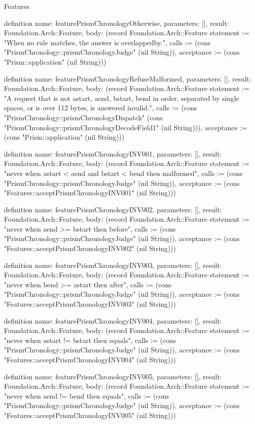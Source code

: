 \begin{lexlean}{Features}
\begin{semanticmodule}
definition{
  name: featurePrismChronologyOtherwise,
  parameters: [],
  result: Foundation.Arch::Feature,
  body: (record Foundation.Arch::Feature {statement := "When no rule matches, the answer is overlappedby.", calls := (cons "PrismChronology::prismChronologyJudge" (nil String)), acceptance := (cons "Prism::application" (nil String))})
}

definition{
  name: featurePrismChronologyRefuseMalformed,
  parameters: [],
  result: Foundation.Arch::Feature,
  body: (record Foundation.Arch::Feature {statement := "A request that is not astart, aend, bstart, bend in order, separated by single spaces, or is over 112 bytes, is answered invalid.", calls := (cons "PrismChronology::prismChronologyDispatch" (cons "PrismChronology::prismChronologyDecodeField1" (nil String))), acceptance := (cons "Prism::application" (nil String))})
}

definition{
  name: featurePrismChronologyINV001,
  parameters: [],
  result: Foundation.Arch::Feature,
  body: (record Foundation.Arch::Feature {statement := "never when astart < aend and bstart < bend then malformed", calls := (cons "PrismChronology::prismChronologyJudge" (nil String)), acceptance := (cons "Features::acceptPrismChronologyINV001" (nil String))})
}

definition{
  name: featurePrismChronologyINV002,
  parameters: [],
  result: Foundation.Arch::Feature,
  body: (record Foundation.Arch::Feature {statement := "never when aend >= bstart then before", calls := (cons "PrismChronology::prismChronologyJudge" (nil String)), acceptance := (cons "Features::acceptPrismChronologyINV002" (nil String))})
}

definition{
  name: featurePrismChronologyINV003,
  parameters: [],
  result: Foundation.Arch::Feature,
  body: (record Foundation.Arch::Feature {statement := "never when bend >= astart then after", calls := (cons "PrismChronology::prismChronologyJudge" (nil String)), acceptance := (cons "Features::acceptPrismChronologyINV003" (nil String))})
}

definition{
  name: featurePrismChronologyINV004,
  parameters: [],
  result: Foundation.Arch::Feature,
  body: (record Foundation.Arch::Feature {statement := "never when astart != bstart then equals", calls := (cons "PrismChronology::prismChronologyJudge" (nil String)), acceptance := (cons "Features::acceptPrismChronologyINV004" (nil String))})
}

definition{
  name: featurePrismChronologyINV005,
  parameters: [],
  result: Foundation.Arch::Feature,
  body: (record Foundation.Arch::Feature {statement := "never when aend != bend then equals", calls := (cons "PrismChronology::prismChronologyJudge" (nil String)), acceptance := (cons "Features::acceptPrismChronologyINV005" (nil String))})
}


\end{semanticmodule}
\end{lexlean}
